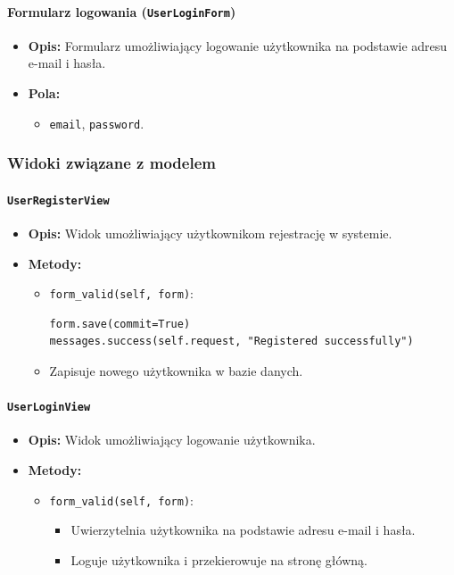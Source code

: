 \documentclass[12pt,a4paper,oneside]{article}
\theoremstyle{definition}
\numberwithin{equation}{section}
\begin{document}
\paragraph{Formularz logowania (\texttt{UserLoginForm})}

\begin{itemize}
    \item \textbf{Opis:} Formularz umożliwiający logowanie użytkownika na podstawie adresu e-mail i hasła.
    \item \textbf{Pola:}
    \begin{itemize}
        \item \texttt{email}, \texttt{password}.
    \end{itemize}
\end{itemize}

\subsubsection*{Widoki związane z modelem}

\paragraph{\texttt{UserRegisterView}}
\begin{itemize}
    \item \textbf{Opis:} Widok umożliwiający użytkownikom rejestrację w systemie.
    \item \textbf{Metody:}
    \begin{itemize}
        \item \texttt{form\_valid(self, form)}:
        \begin{lstlisting}
form.save(commit=True)
messages.success(self.request, "Registered successfully")
        \end{lstlisting}
        \item Zapisuje nowego użytkownika w bazie danych.
    \end{itemize}
\end{itemize}

\paragraph{\texttt{UserLoginView}}
\begin{itemize}
    \item \textbf{Opis:} Widok umożliwiający logowanie użytkownika.
    \item \textbf{Metody:}
    \begin{itemize}
        \item \texttt{form\_valid(self, form)}:
        \begin{itemize}
            \item Uwierzytelnia użytkownika na podstawie adresu e-mail i hasła.
            \item Loguje użytkownika i przekierowuje na stronę główną.
        \end{itemize}
    \end{itemize}
\end{itemize}
\end{document}
